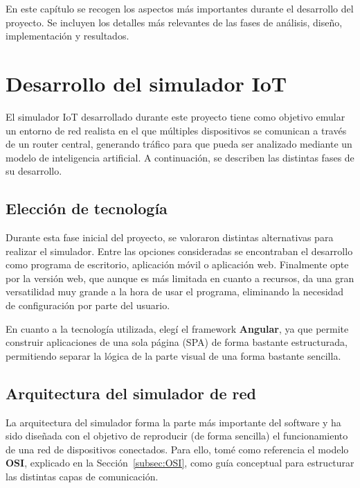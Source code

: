 
En este capítulo se recogen los aspectos más importantes durante el desarrollo del proyecto. Se incluyen los detalles más relevantes de las fases de análisis, diseño, implementación y resultados.

\section{Desarrollo del simulador IoT}
\label{sec:DesarolloSimuladorIot}
El simulador IoT desarrollado durante este proyecto tiene como objetivo emular un entorno de red realista en el que múltiples dispositivos se comunican a través de un router central, generando tráfico para que pueda ser analizado mediante un modelo de inteligencia artificial. A continuación, se describen las distintas fases de su desarrollo.

\subsection{Elección de tecnología}
\label{subsec:EleccionTecnologia}
Durante esta fase inicial del proyecto, se valoraron distintas alternativas para realizar el simulador. Entre las opciones consideradas se encontraban el desarrollo como programa de escritorio, aplicación móvil o aplicación web. Finalmente opte por la versión web, que aunque es más limitada en cuanto a recursos, da una gran versatilidad muy grande a la hora de usar el programa, eliminando la necesidad de configuración por parte del usuario. 

En cuanto a la tecnología utilizada, elegí el framework \textbf{Angular}, ya que permite construir aplicaciones de una sola página (SPA) de forma bastante estructurada, permitiendo separar la lógica de la parte visual de una forma bastante sencilla.

\subsection{Arquitectura del simulador de red}
\label{subsec:ArquitecturaSimulador}
La arquitectura del simulador forma la parte más importante del software y ha sido diseñada con el objetivo de reproducir (de forma sencilla) el funcionamiento de una red de dispositivos conectados. Para ello, tomé como referencia el modelo \textbf{OSI}, explicado en la Sección~\ref{subsec:OSI}, como guía conceptual para estructurar las distintas capas de comunicación.

